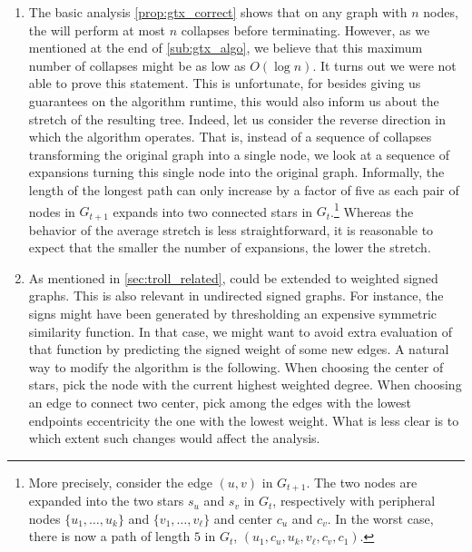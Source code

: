 \begin{enumerate}[1)]

	\item The basic analysis \autoref{prop:gtx_correct} shows that on any graph with $n$ nodes, the
		\gtx{} will perform at most $n$ collapses before terminating. However, as we mentioned
		 at the end of \autoref{sub:gtx_algo}, we believe that this
		maximum number of collapses might be as low as $O(\log n)$. It turns out we were not able to
		prove this statement. This is unfortunate, for besides giving us guarantees on the algorithm
		runtime, this would also inform us about the stretch of the resulting tree. Indeed, let us
		consider the reverse direction in which the \gtx{} algorithm operates. That is, instead of a
		sequence of collapses transforming the original graph into a single node, we look at a sequence
		of expansions turning this single node into the original graph. Informally, the length of the
		longest path can only increase by a factor of five as each pair of nodes in $G_{t+1}$ expands
		into two connected stars in $G_{t}$.\footnote{More precisely, consider the edge $(u,v)$ in
		$G_{t+1}$. The two nodes are expanded into the two stars $s_u$ and $s_v$ in $G_t$, respectively
		with peripheral nodes $\{u_1, \ldots, u_k\}$ and $\{v_1, \ldots, v_\ell\}$ and center $c_u$ and
		$c_v$. In the worst case, there is now a path of length $5$ in $G_t$, \eg{} $(u_1, c_u, u_k,
		v_\ell, c_v, c_1)$.} Whereas the behavior of the average stretch is less straightforward, it is
		reasonable to expect that the smaller the number of expansions, the lower the stretch.

	\item As mentioned in \autoref{sec:troll_related}, \esp{} could be extended to weighted signed
		graphs. This is also relevant in undirected signed graphs. For instance, the signs might have
		been generated by thresholding an expensive symmetric similarity function. In that case, we
		might want to avoid extra evaluation of that function by predicting the signed weight of some
		new edges. A natural way to modify the \gtx{} algorithm is the following. When choosing the
		center of stars, pick the node with the current highest weighted degree. When choosing an edge
		to connect two center, pick among the edges with the lowest endpoints eccentricity the one with
		the lowest weight. What is less clear is to which extent such changes would affect the analysis.


\end{enumerate}
